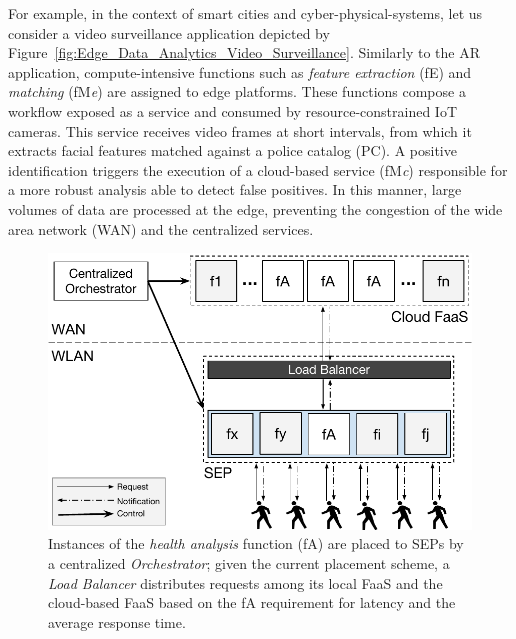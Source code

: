 For example, in the context of smart cities and cyber-physical-systems, let us consider a video surveillance application depicted by Figure~\ref{fig:Edge_Data_Analytics_Video_Surveillance}. Similarly to the AR application, compute-intensive functions such as \textit{feature extraction} (fE) and \textit{matching} (fM\textit{e}) are assigned to edge platforms.
These functions compose a workflow exposed as a service and consumed by resource-constrained IoT cameras. This service receives video frames at short intervals, from which it extracts facial features matched against a police catalog (PC). A positive identification triggers the execution of a cloud-based service (fM\textit{c}) responsible for a more robust analysis able to detect false positives. In this manner, large volumes of data are processed at the edge, preventing the congestion of the wide area network (WAN) and the centralized services.

\begin{figure}[tbp]
	\centering
	\includegraphics[width=\linewidth]{Figs/Edge_Data_Analytics_Personal_Assistant.pdf}
	\caption{Instances of the \textit{health analysis} function (fA) are placed to SEPs by a centralized \textit{Orchestrator}; given the current placement scheme, a \textit{Load Balancer} distributes requests among its local FaaS and the cloud-based FaaS based on the fA requirement for latency and the average response time.}
	\label{fig:Edge_Data_Analytics_Personal_Assistant}
\end{figure}


